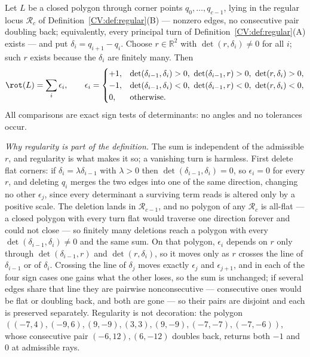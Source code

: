 \begin{definition}\label{CV:def:rot}\leanok{}
Let $L$ be a closed polygon through corner points $q_0,\dots,q_{c-1}$, lying
in the regular locus $\mathcal R_c$ of Definition~\ref{CV:def:regular}(B) ---
nonzero edges, no consecutive pair doubling back; equivalently, every
principal turn of Definition~\ref{CV:def:regular}(A) exists --- and put
$\delta_i=q_{i+1}-q_i$. Choose $r\in\mathbb{R}^2$ with $\det(r,\delta_i)\neq0$
for all $i$; such $r$ exists because the $\delta_i$ are finitely many. Then
\[
   \rot(L)=\sum_{i}\epsilon_i,\qquad
   \epsilon_i=\begin{cases}
     +1,&\det(\delta_{i-1},\delta_i)>0,\ \det(\delta_{i-1},r)>0,\ \det(r,\delta_i)>0,\\
     -1,&\det(\delta_{i-1},\delta_i)<0,\ \det(\delta_{i-1},r)<0,\ \det(r,\delta_i)<0,\\
     0,&\text{otherwise.}
   \end{cases}
\]
All comparisons are exact sign tests of determinants: no angles and no
tolerances occur.

\emph{Why regularity is part of the definition.} The sum is independent of
the admissible $r$, and regularity is what makes it so; a vanishing turn is
harmless. First delete flat corners: if $\delta_i=\lambda\delta_{i-1}$ with
$\lambda>0$ then $\det(\delta_{i-1},\delta_i)=0$, so $\epsilon_i=0$ for every
$r$, and deleting $q_i$ merges the two edges into one of the same direction,
changing no other $\epsilon_j$, since every determinant a surviving term
reads is altered only by a positive scale. The deletion lands in
$\mathcal R_{c-1}$, and no polygon of any $\mathcal R_c$ is all-flat --- a
closed polygon with every turn flat would traverse one direction forever and
could not close --- so finitely many deletions reach a polygon with every
$\det(\delta_{i-1},\delta_i)\neq0$ and the same sum. On that polygon,
$\epsilon_i$ depends on $r$ only through $\det(\delta_{i-1},r)$ and
$\det(r,\delta_i)$, so it moves only as $r$ crosses the line of
$\delta_{i-1}$ or of $\delta_i$. Crossing the line of $\delta_j$ moves
exactly $\epsilon_j$ and $\epsilon_{j+1}$, and in each of the four sign cases
one gains what the other loses, so the sum is unchanged; if several edges
share that line they are pairwise nonconsecutive --- consecutive ones would
be flat or doubling back, and both are gone --- so their pairs are disjoint
and each is preserved separately. Regularity is not decoration: the polygon
$((-7,4),(-9,6),(9,-9),(3,3),(9,-9),(-7,-7),(-7,-6))$, whose consecutive
pair $(-6,12),(6,-12)$ doubles back, returns both $-1$ and $0$ at admissible
rays.


\end{definition}
